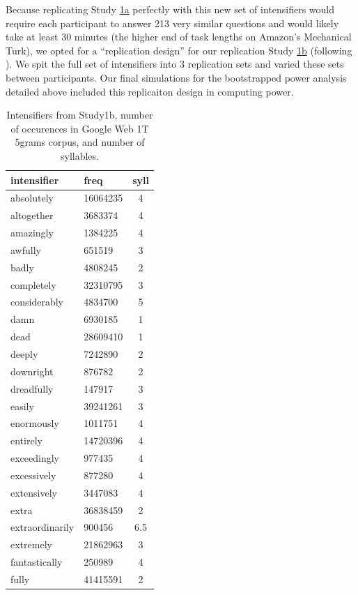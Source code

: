 \documentclass[10pt,letterpaper]{article}
\begin{document}
Because replicating Study \hyperref[sec:study1a]{1a} perfectly with this new set of intensifiers would require each participant to answer 213 very similar questions and would likely take at least 30 minutes (the higher end of task lengths on Amazon’s Mechanical Turk), we opted for a ``replication design'' for our replication Study \hyperref[sec:study1b]{1b} (following ). We spit the full set of intensifiers into 3 replication sets and varied these sets between participants. Our final simulations for the bootstrapped power analysis detailed above included this replicaiton design in computing power.

\begin{table}[ht]
 \begin{center}
 \footnotesize
  \caption{Intensifiers from Study1b, number of occurences in Google Web 1T 5grams corpus, and number of syllables.}
  \label{table:intensifiers_study1b}
  \begin{tabular}{llc}
   \hline
   intensifier & freq & syll \\
   \hline
absolutely & 16064235 & 4 \\
altogether & 3683374 & 4 \\
amazingly & 1384225 & 4 \\
awfully & 651519 & 3 \\
badly & 4808245 & 2 \\
completely & 32310795 & 3 \\
considerably & 4834700 & 5 \\
damn & 6930185 & 1 \\
dead & 28609410 & 1 \\
deeply & 7242890 & 2 \\
downright & 876782 & 2 \\
dreadfully & 147917 & 3 \\
easily & 39241261 & 3 \\
enormously & 1011751 & 4 \\
entirely & 14720396 & 4 \\
exceedingly & 977435 & 4 \\
excessively & 877280 & 4 \\
extensively & 3447083 & 4 \\
extra & 36838459 & 2 \\
extraordinarily & 900456 & 6.5 \\
extremely & 21862963 & 3 \\
fantastically & 250989 & 4 \\
fully & 41415591 & 2 \\

\end{tabular}
\end{center}
\end{table}
\end{document}

